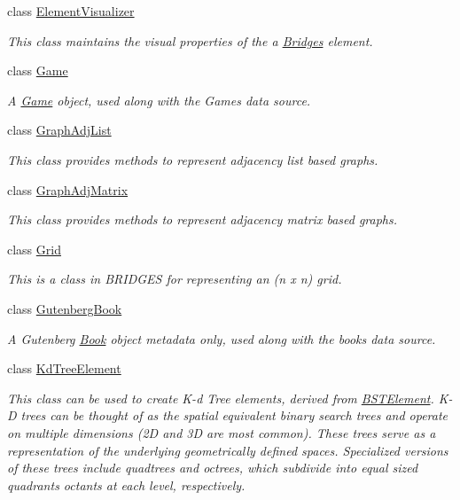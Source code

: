 \begin{DoxyCompactItemize}
class \hyperlink{classbridges_1_1_element_visualizer}{Element\+Visualizer}
\begin{DoxyCompactList}\small\item\em This class maintains the visual properties of the a \hyperlink{classbridges_1_1_bridges}{Bridges} element. \end{DoxyCompactList}\item 
class \hyperlink{classbridges_1_1_game}{Game}
\begin{DoxyCompactList}\small\item\em A \hyperlink{classbridges_1_1_game}{Game} object, used along with the Games data source. \end{DoxyCompactList}\item 
class \hyperlink{classbridges_1_1_graph_adj_list}{Graph\+Adj\+List}
\begin{DoxyCompactList}\small\item\em This class provides methods to represent adjacency list based graphs. \end{DoxyCompactList}\item 
class \hyperlink{classbridges_1_1_graph_adj_matrix}{Graph\+Adj\+Matrix}
\begin{DoxyCompactList}\small\item\em This class provides methods to represent adjacency matrix based graphs. \end{DoxyCompactList}\item 
class \hyperlink{classbridges_1_1_grid}{Grid}
\begin{DoxyCompactList}\small\item\em This is a class in B\+R\+I\+D\+G\+E\+S for representing an (n x n) grid. \end{DoxyCompactList}\item 
class \hyperlink{classbridges_1_1_gutenberg_book}{Gutenberg\+Book}
\begin{DoxyCompactList}\small\item\em A Gutenberg \hyperlink{classbridges_1_1_book}{Book} object metadata only, used along with the books data source. \end{DoxyCompactList}\item 
class \hyperlink{classbridges_1_1_kd_tree_element}{Kd\+Tree\+Element}
\begin{DoxyCompactList}\small\item\em This class can be used to create K-\/d Tree elements, derived from \hyperlink{classbridges_1_1_b_s_t_element}{B\+S\+T\+Element}. K-\/\+D trees can be thought of as the spatial equivalent binary search trees and operate on multiple dimensions (2\+D and 3\+D are most common). These trees serve as a representation of the underlying geometrically defined spaces. Specialized versions of these trees include quadtrees and octrees, which subdivide into equal sized quadrants octants at each level, respectively. \end{DoxyCompactList}\item 

\end{DoxyCompactItemize}
